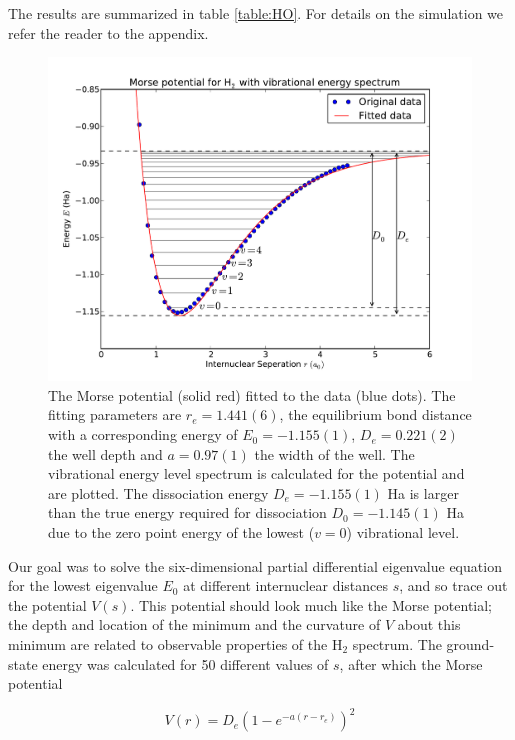 \documentclass{article}
\begin{document}
The results are summarized in table \ref{table:HO}. For details on the simulation we refer the reader to the appendix. \\

\begin{figure}
 \centering
 \includegraphics[width=\linewidth]{plot.pdf}
 \caption{The Morse potential (solid red) fitted to the data (blue dots). The fitting parameters are $r_e=1.441(6)$, the equilibrium bond distance with a corresponding energy of $E_0=-1.155(1)$, $D_e=0.221(2)$ the well depth and $a=0.97(1)$ the width of the well. The vibrational energy level spectrum is calculated for the potential and are plotted. The dissociation energy $D_e=-1.155(1)$ Ha is larger than the true energy required for dissociation $D_0=-1.145(1)$ Ha due to the zero point energy of the lowest ($v = 0$) vibrational level.}\label{fig:plot}
\end{figure}

Our goal was to solve the six-dimensional partial differential eigenvalue equation for the lowest eigenvalue $E_0$ at different internuclear distances $s$, and so trace out the potential $V(s)$. This potential should look much like the Morse potential; the depth and location of the minimum and the curvature of $V$ about this minimum are related to observable properties of the H$_2$ spectrum. The ground-state energy was calculated for 50 different values of $s$, after which the Morse potential 

\begin{equation}
V(r) = D_e ( 1-e^{-a(r-r_e)} )^2 
\end{equation}
\end{document}
